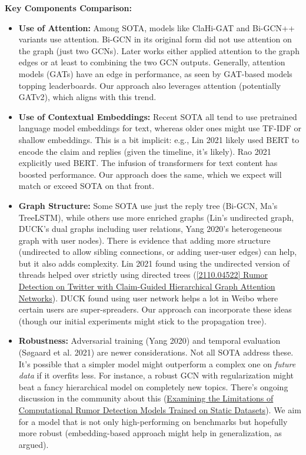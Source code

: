 \documentclass[12pt,a4paper]{report}
\begin{document}
\textbf{Key Components Comparison:}
\begin{itemize}[leftmargin=1.2cm]
    \item \textbf{Use of Attention:} Among SOTA, models like ClaHi-GAT and Bi-GCN++ variants use attention. Bi-GCN in its original form did not use attention on the graph (just two GCNs). Later works either applied attention to the graph edges or at least to combining the two GCN outputs. Generally, attention models (GATs) have an edge in performance, as seen by GAT-based models topping leaderboards. Our approach also leverages attention (potentially GATv2), which aligns with this trend.
    \item \textbf{Use of Contextual Embeddings:} Recent SOTA all tend to use pretrained language model embeddings for text, whereas older ones might use TF-IDF or shallow embeddings. This is a bit implicit: e.g., Lin 2021 likely used BERT to encode the claim and replies (given the timeline, it’s likely). Rao 2021 explicitly used BERT. The infusion of transformers for text content has boosted performance. Our approach does the same, which we expect will match or exceed SOTA on that front.
    \item \textbf{Graph Structure:} Some SOTA use just the reply tree (Bi-GCN, Ma’s TreeLSTM), while others use more enriched graphs (Lin’s undirected graph, DUCK’s dual graphs including user relations, Yang 2020’s heterogeneous graph with user nodes). There is evidence that adding more structure (undirected to allow sibling connections, or adding user-user edges) can help, but it also adds complexity. Lin 2021 found using the undirected version of threads helped over strictly using directed trees (\href{https://ar5iv.org/pdf/2110.04522#:~:text=on%20Twitter15%2616%2C%20and%20PHEME%20respectively%2C,features%20at%20each%20GAT%20layer}{[2110.04522] Rumor Detection on Twitter with Claim-Guided Hierarchical Graph Attention Networks}). DUCK found using user network helps a lot in Weibo where certain users are super-spreaders. Our approach can incorporate these ideas (though our initial experiments might stick to the propagation tree).
    \item \textbf{Robustness:} Adversarial training (Yang 2020) and temporal evaluation (Søgaard et al. 2021) are newer considerations. Not all SOTA address these. It’s possible that a simpler model might outperform a complex one on \textit{future data} if it overfits less. For instance, a robust GCN with regularization might beat a fancy hierarchical model on completely new topics. There’s ongoing discussion in the community about this (\href{https://arxiv.org/html/2309.11576v2#:~:text=Most%20of%20these%20rumor%20detection,58}{Examining the Limitations of Computational Rumor Detection Models Trained on Static Datasets}). We aim for a model that is not only high-performing on benchmarks but hopefully more robust (embedding-based approach might help in generalization, as argued).
\end{itemize}
\end{document}
